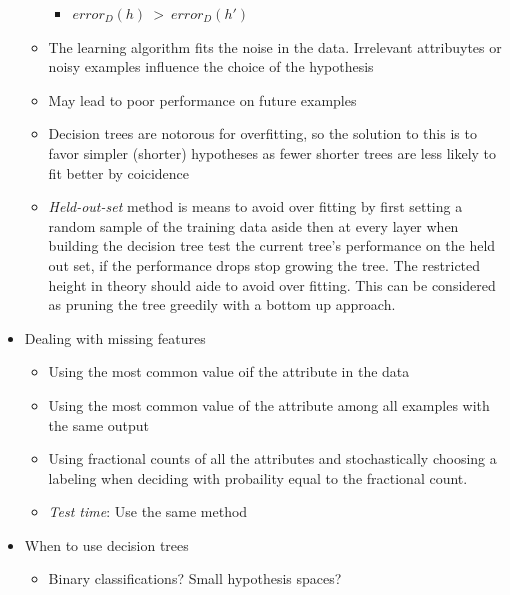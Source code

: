 \documentclass{article}
\begin{document}
\begin{itemize}
\begin{itemize}
\begin{itemize}
	\item $error_D(h) ~ > ~ error_D(h')$
	\end{itemize}
	\item The learning algorithm fits the noise in the data. Irrelevant attribuytes or noisy examples influence the choice of the hypothesis
	\item May lead to poor performance on future examples
	\item Decision trees are notorous for overfitting, so the solution to this is to favor simpler (shorter) hypotheses as fewer shorter trees are less likely to fit better by coicidence
	\item \textit{Held-out-set} method is means to avoid over fitting by first setting a random sample of the training data aside then at every layer when building the decision tree test the current tree's performance on the held out set, if the performance drops stop growing the tree. The restricted height in theory should aide to avoid over fitting. This can be considered as pruning the tree greedily with a bottom up approach. 
	\end{itemize}
\item Dealing with missing features
	\begin{itemize}
	\item Using the most common value oif the attribute in the data
	\item Using the most common value of the attribute among all examples with the same output
	\item Using fractional counts of all the attributes and stochastically choosing a labeling when deciding with probaility equal to the fractional count.
	\item {\em Test time}: Use the same method
	\end{itemize}
\item When to use decision trees
	\begin{itemize}
	\item Binary classifications? Small hypothesis spaces?
	\end{itemize}
\end{itemize}
\end{document}
